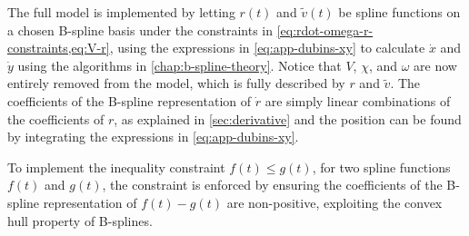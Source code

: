 The full model is implemented by letting $r(t)$ and $\tilde v(t)$ be spline functions on a chosen B-spline basis under the constraints in \cref{eq:rdot-omega-r-constraints,eq:V-r}, using the expressions in \cref{eq:app-dubins-xy} to calculate $\dot x$ and $\dot y$ using the algorithms in \cref{chap:b-spline-theory}. Notice that $V$, $\chi$, and $\omega$ are now entirely removed from the model, which is fully described by $r$ and $\tilde v$. The coefficients of the B-spline representation of $\dot r$ are simply linear combinations of the coefficients of $r$, as explained in \cref{sec:derivative} and the position can be found by integrating the expressions in \cref{eq:app-dubins-xy}.

To implement the inequality constraint $f(t) \le g(t)$, for two spline functions $f(t)$ and $g(t)$, the constraint is enforced by ensuring the coefficients of the B-spline representation of $f(t) - g(t)$ are non-positive, exploiting the convex hull property of B-splines. 